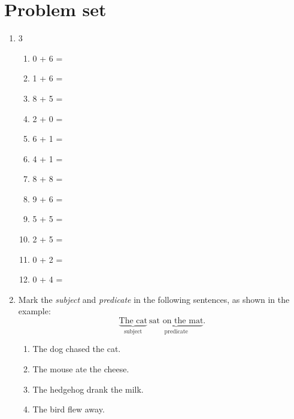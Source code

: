 \documentclass{tufte-book}
\begin{document}
\clearpage\section{Problem set }

\begin{enumerate}
  \item
  \begin{multicols}{3}

    \begin{enumerate}\bigskip
      \item 0 + 6 = \dotfill\bigskip
      \item 1 + 6 = \dotfill\bigskip
      \item 8 + 5 = \dotfill\bigskip
      \item 2 + 0 = \dotfill
      \item 6 + 1 = \dotfill\bigskip
      \item 4 + 1 = \dotfill\bigskip
      \item 8 + 8 = \dotfill\bigskip
      \item 9 + 6 = \dotfill
      \item 5 + 5 = \dotfill\bigskip
      \item 2 + 5 = \dotfill\bigskip
      \item 0 + 2 = \dotfill\bigskip
      \item 0 + 4 = \dotfill
    \end{enumerate}
\end{multicols}

\item Mark the \textit{subject} and \textit{predicate} in the following sentences, as shown in the example:
$$\underbrace{\text{The cat}}_{\text{subject}} \  \underbrace{\text{sat on the mat}}_{\text{predicate}}.$$
\begin{enumerate}
  \item The dog chased the cat.\bigskip
  \item The mouse ate the cheese.\bigskip
  \item The hedgehog drank the milk.\bigskip
  \item The bird flew away.\bigskip
\end{enumerate}


\end{enumerate}
\end{document}
